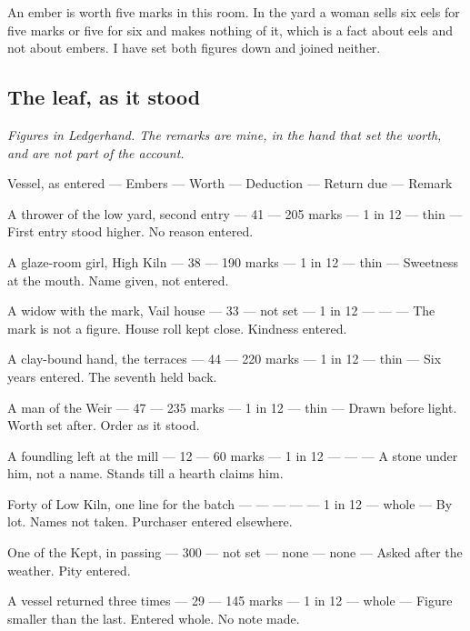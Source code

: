 \documentclass{design/chronicle}
\begin{document}
An ember is worth five marks in this room. In the yard a woman sells six eels for five marks or five for six and makes nothing of it, which is a fact about eels and not about embers. I have set both figures down and joined neither.

\subsection*{The leaf, as it stood}

\emph{Figures in Ledgerhand. The remarks are mine, in the hand that set the worth, and are not part of the account.}

Vessel, as entered — Embers — Worth — Deduction — Return due — Remark\par

A thrower of the low yard, second entry — 41 — 205 marks — 1 in 12 — thin — First entry stood higher. No reason entered.\par

A glaze-room girl, High Kiln — 38 — 190 marks — 1 in 12 — thin — Sweetness at the mouth. Name given, not entered.\par

A widow with the mark, Vail house — 33 — not set — 1 in 12 — — — The mark is not a figure. House roll kept close. Kindness entered.\par

A clay-bound hand, the terraces — 44 — 220 marks — 1 in 12 — thin — Six years entered. The seventh held back.\par

A man of the Weir — 47 — 235 marks — 1 in 12 — thin — Drawn before light. Worth set after. Order as it stood.\par

A foundling left at the mill — 12 — 60 marks — 1 in 12 — — — A stone under him, not a name. Stands till a hearth claims him.\par

Forty of Low Kiln, one line for the batch — — — — — 1 in 12 — whole — By lot. Names not taken. Purchaser entered elsewhere.\par

One of the Kept, in passing — 300 — not set — none — none — Asked after the weather. Pity entered.\par

A vessel returned three times — 29 — 145 marks — 1 in 12 — whole — Figure smaller than the last. Entered whole. No note made.\par
\end{document}
